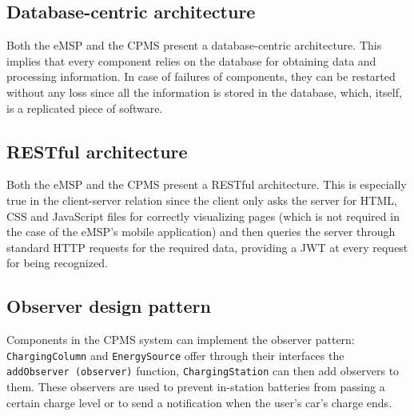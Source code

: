\subsection{Database-centric architecture}

Both the eMSP and the CPMS present a database-centric architecture. This implies that every component relies on the database for obtaining data and processing information. In case of failures of components, they can be restarted without any loss since all the information is stored in the database, which, itself, is a replicated piece of software.

\subsection{RESTful architecture}

Both the eMSP and the CPMS present a RESTful architecture. This is especially true in the client-server relation since the client only asks the server for HTML, CSS and JavaScript files for correctly visualizing pages (which is not required in the case of the eMSP's mobile application) and then queries the server through standard HTTP requests for the required data, providing a JWT at every request for being recognized.

\subsection{Observer design pattern}

Components in the CPMS system can implement the observer pattern: \texttt{ChargingColumn} and \texttt{EnergySource} offer through their interfaces the \texttt{addObserver (observer)} function, \texttt{ChargingStation} can then add observers to them. These observers are used to prevent in-station batteries from passing a certain charge level or to send a notification when the user's car's charge ends.
